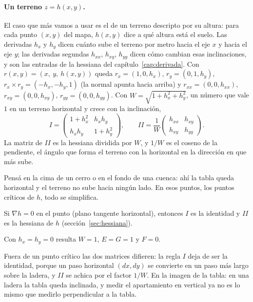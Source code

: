 \paragraph{Un terreno \(z=h(x,y)\).} El caso que más vamos a usar es el de un terreno
descripto por su altura: para cada punto \((x,y)\) del mapa, \(h(x,y)\) dice a qué altura está
el suelo. Las derivadas \(h_x\) y \(h_y\) dicen cuánto sube el terreno por metro hacia el eje
\(x\) y hacia el eje \(y\); las derivadas segundas \(h_{xx}\), \(h_{xy}\), \(h_{yy}\) dicen
cómo cambian esas inclinaciones, y son las entradas de la hessiana del
capítulo~\ref{cap:derivada}. Con \(r(x,y)=(x,\ y,\ h(x,y))\) queda
\(r_x=(1,0,h_x)\), \(r_y=(0,1,h_y)\), \(r_x\times r_y=(-h_x,-h_y,1)\) (la normal apunta hacia
arriba) y \(r_{xx}=(0,0,h_{xx})\), \(r_{xy}=(0,0,h_{xy})\), \(r_{yy}=(0,0,h_{yy})\). Con
\(W=\sqrt{1+h_x^2+h_y^2}\), un número que vale \(1\) en un terreno horizontal y crece con la
inclinación,
\[
  I=\begin{pmatrix}1+h_x^2&h_xh_y\\h_xh_y&1+h_y^2\end{pmatrix},\qquad
  II=\frac1W\begin{pmatrix}h_{xx}&h_{xy}\\h_{xy}&h_{yy}\end{pmatrix}.
\]
La matriz de \(II\) es la hessiana dividida por \(W\), y \(1/W\) es el coseno de la pendiente,
el ángulo que forma el terreno con la horizontal en la dirección en que más sube.

Pensá en la cima de un cerro o en el fondo de una cuenca: ahí la tabla queda horizontal y el
terreno no sube hacia ningún lado. En esos puntos, los puntos críticos de \(h\), todo se
simplifica.

\begin{proposicion}\label{prop:II-hessiana}
Si \(\nabla h=0\) en el punto (plano tangente horizontal), entonces \(I\) es la identidad y
\(II\) es la hessiana de \(h\) (sección~\ref{sec:hessiana}).
\end{proposicion}

\begin{demostracion}
Con \(h_x=h_y=0\) resulta \(W=1\), \(E=G=1\) y \(F=0\).
\end{demostracion}

Fuera de un punto crítico las dos matrices difieren: la regla \(I\) deja de ser la identidad,
porque un paso horizontal \((dx,dy)\) se convierte en un paso más largo sobre la ladera, y
\(II\) se achica por el factor \(1/W\). En la imagen de la tabla: en una ladera la tabla queda
inclinada, y medir el apartamiento en vertical ya no es lo mismo que medirlo perpendicular a la
tabla.

